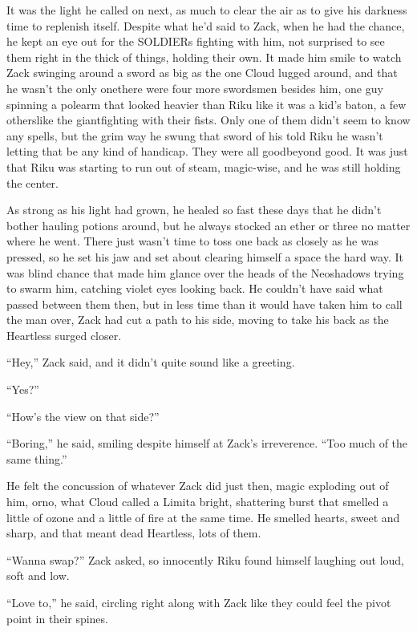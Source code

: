 It was the light he called on next, as much to clear the air as to give his darkness time to replenish itself. Despite what he'd said to Zack, when he had the chance, he kept an eye out for the SOLDIERs fighting with him, not surprised to see them right in the thick of things, holding their own. It made him smile to watch Zack swinging around a sword as big as the one Cloud lugged around, and that he wasn't the only one\textemdash there were four more swordsmen besides him, one guy spinning a polearm that looked heavier than Riku like it was a kid's baton, a few others\textemdash like the giant\textemdash fighting with their fists. Only one of them didn't seem to know any spells, but the grim way he swung that sword of his told Riku he wasn't letting that be any kind of handicap. They were all good\textemdash beyond good. It was just that Riku was starting to run out of steam, magic-wise, and he was still holding the center.

As strong as his light had grown, he healed so fast these days that he didn't bother hauling potions around, but he always stocked an ether or three no matter where he went. There just wasn't time to toss one back as closely as he was pressed, so he set his jaw and set about clearing himself a space the hard way. It was blind chance that made him glance over the heads of the Neoshadows trying to swarm him, catching violet eyes looking back. He couldn't have said what passed between them then, but in less time than it would have taken him to call the man over, Zack had cut a path to his side, moving to take his back as the Heartless surged closer.

``Hey,'' Zack said, and it didn't quite sound like a greeting.

``Yes?''

``How's the view on that side?''

``Boring,'' he said, smiling despite himself at Zack's irreverence. ``Too much of the same thing.''

He felt the concussion of whatever Zack did just then, magic exploding out of him, or\textemdash no, what Cloud called a Limit\textemdash a bright, shattering burst that smelled a little of ozone and a little of fire at the same time. He smelled hearts, sweet and sharp, and that meant dead Heartless, lots of them.

``Wanna swap?'' Zack asked, so innocently Riku found himself laughing out loud, soft and low.

``Love to,'' he said, circling right along with Zack like they could feel the pivot point in their spines.

